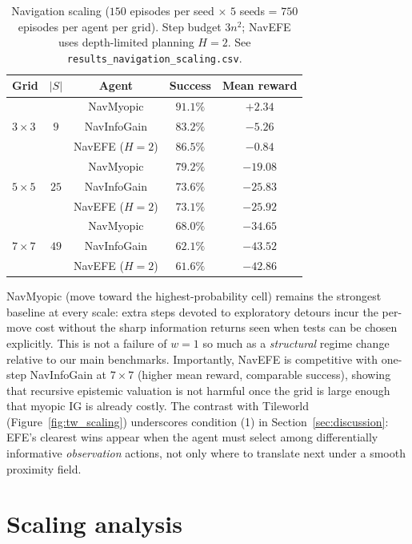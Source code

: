 \documentclass{article}
\begin{document}
\begin{table}[h]
\centering
\caption{Navigation scaling ($150$ episodes per seed $\times$ $5$ seeds = $750$ episodes per agent per grid). Step budget $3n^2$; NavEFE uses depth-limited planning $H{=}2$. See \texttt{results\_navigation\_scaling.csv}.}
\label{tab:nav_scaling}
\begin{small}
\begin{tabular}{lcccc}
\toprule
Grid & $|S|$ & Agent & Success & Mean reward \\
\midrule
\multirow{3}{*}{$3{\times}3$} & \multirow{3}{*}{$9$} & NavMyopic & $91.1\%$ & $+2.34$ \\
& & NavInfoGain & $83.2\%$ & $-5.26$ \\
& & NavEFE ($H{=}2$) & $86.5\%$ & $-0.84$ \\
\midrule
\multirow{3}{*}{$5{\times}5$} & \multirow{3}{*}{$25$} & NavMyopic & $79.2\%$ & $-19.08$ \\
& & NavInfoGain & $73.6\%$ & $-25.83$ \\
& & NavEFE ($H{=}2$) & $73.1\%$ & $-25.92$ \\
\midrule
\multirow{3}{*}{$7{\times}7$} & \multirow{3}{*}{$49$} & NavMyopic & $68.0\%$ & $-34.65$ \\
& & NavInfoGain & $62.1\%$ & $-43.52$ \\
& & NavEFE ($H{=}2$) & $61.6\%$ & $-42.86$ \\
\bottomrule
\end{tabular}
\end{small}
\end{table}

NavMyopic (move toward the highest-probability cell) remains the strongest baseline at every scale: extra steps devoted to exploratory detours incur the per-move cost without the sharp information returns seen when tests can be chosen explicitly. This is not a failure of $w{=}1$ so much as a \emph{structural} regime change relative to our main benchmarks. Importantly, NavEFE is competitive with one-step NavInfoGain at $7{\times}7$ (higher mean reward, comparable success), showing that recursive epistemic valuation is not harmful once the grid is large enough that myopic IG is already costly. The contrast with Tileworld (Figure~\ref{fig:tw_scaling}) underscores condition (1) in Section~\ref{sec:discussion}: EFE's clearest wins appear when the agent must select among differentially informative \emph{observation} actions, not only where to translate next under a smooth proximity field.

\section{Scaling analysis}
\label{app:scaling}
\end{document}
